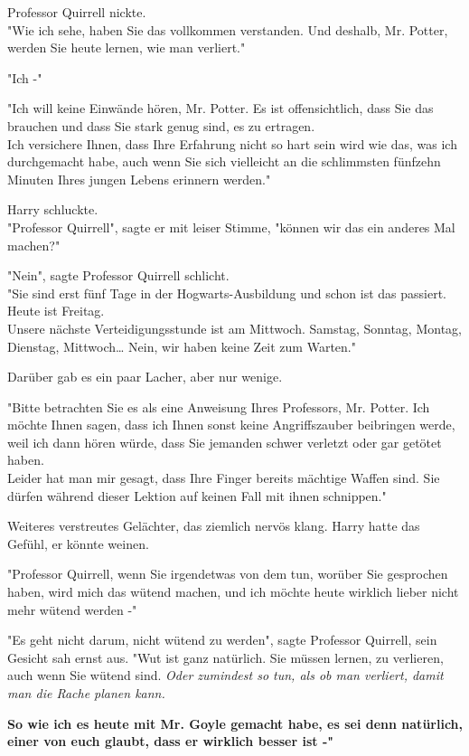 {Professor Quirrell nickte.\\ "Wie ich sehe, haben Sie das vollkommen verstanden. Und deshalb, Mr. Potter, werden Sie heute lernen, wie man verliert."

"Ich -"

"Ich will keine Einwände hören, Mr. Potter. Es ist offensichtlich, dass Sie das brauchen und dass Sie stark genug sind, es zu ertragen.\\ Ich versichere Ihnen, dass Ihre Erfahrung nicht so hart sein wird wie das, was ich durchgemacht habe, auch wenn Sie sich vielleicht an die schlimmsten fünfzehn Minuten Ihres jungen Lebens erinnern werden."

Harry schluckte.\\ "Professor Quirrell", sagte er mit leiser Stimme, "können wir das ein anderes Mal machen?"

"Nein", sagte Professor Quirrell schlicht.\\ "Sie sind erst fünf Tage in der Hogwarts-Ausbildung und schon ist das passiert. Heute ist Freitag.\\ Unsere nächste Verteidigungsstunde ist am Mittwoch. Samstag, Sonntag, Montag, Dienstag, Mittwoch… Nein, wir haben keine Zeit zum Warten."

Darüber gab es ein paar Lacher, aber nur wenige.

"Bitte betrachten Sie es als eine Anweisung Ihres Professors, Mr. Potter. Ich möchte Ihnen sagen, dass ich Ihnen sonst keine Angriffszauber beibringen werde, weil ich dann hören würde, dass Sie jemanden schwer verletzt oder gar getötet haben.\\ Leider hat man mir gesagt, dass Ihre Finger bereits mächtige Waffen sind. Sie dürfen während dieser Lektion auf keinen Fall mit ihnen schnippen."

Weiteres verstreutes Gelächter, das ziemlich nervös klang. Harry hatte das Gefühl, er könnte weinen.

"Professor Quirrell, wenn Sie irgendetwas von dem tun, worüber Sie gesprochen haben, wird mich das wütend machen, und ich möchte heute wirklich lieber nicht mehr wütend werden -"

"Es geht nicht darum, nicht wütend zu werden", sagte Professor Quirrell, sein Gesicht sah ernst aus. "Wut ist ganz natürlich. Sie müssen lernen, zu verlieren, auch wenn Sie wütend sind. \emph{Oder zumindest so tun, als ob man verliert, damit man die Rache planen kann.}

\textbf{So wie ich es heute mit Mr. Goyle gemacht habe, es sei denn natürlich, einer von euch glaubt, dass er wirklich besser ist -"}

}
